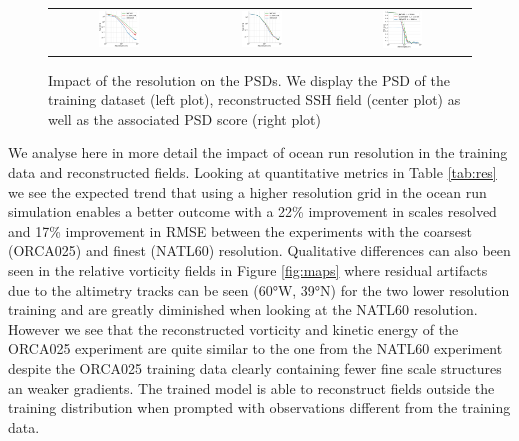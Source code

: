 \begin{bibunit}
\begin{figure}[H]
\begin{tabular}{ccc}
\includegraphics[width=0.31\textwidth]{00_Simulearning/figures/plots2/isotrop_psd_res_train.png} &
\includegraphics[width=0.31\textwidth]{00_Simulearning/figures/plots2/isotrop_psd_res_rec.png} &
\includegraphics[width=0.31\textwidth]{00_Simulearning/figures/plots2/res_1d_psd_score.png}


\end{tabular}
\vspace{-3mm}
\caption{
Impact of the resolution on the PSDs. We display the PSD of the training dataset (left plot), reconstructed SSH field (center plot) as well as the associated PSD score (right plot)}\vspace{-5mm}
\label{fig:respsd}
\end{figure}


We analyse here in more detail the impact of ocean run resolution in the training data and reconstructed fields. Looking at quantitative metrics in Table \ref{tab:res} we see the expected trend that using a higher resolution grid in the ocean run simulation enables a better outcome with a 22\% improvement in scales resolved and 17\% improvement in RMSE between the experiments with the coarsest (ORCA025) and finest (NATL60) resolution.
Qualitative differences can also been seen in the relative vorticity fields in Figure \ref{fig:maps} where residual artifacts due to the altimetry tracks can be seen (60°W, 39°N) for the two lower resolution training and are greatly diminished when looking at the NATL60 resolution. 
However we see that the reconstructed vorticity and kinetic energy of the ORCA025 experiment are quite similar to the one from the NATL60 experiment despite the ORCA025 training data clearly containing fewer fine scale structures an weaker gradients. The trained model is able to reconstruct fields outside the training distribution when prompted with observations different from the training data. 


\end{bibunit}
